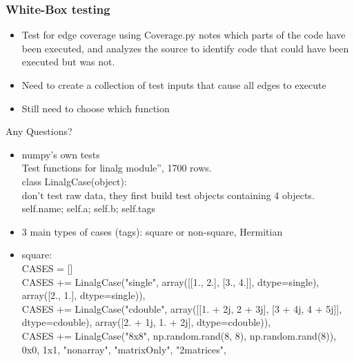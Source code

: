 \documentclass{beamer}
\begin{document}
\begin{frame}\frametitle{White-Box testing} 
\begin{itemize}
\item Test for edge coverage using Coverage.py
 notes which parts of the code have been executed, and analyzes the source to identify code that could have been executed but was not.
\item Need to create a collection of test inputs that cause all edges to execute
\item Still need to choose which function
\end{itemize}
\end{frame}

\begin{frame}
Any Questions?
\end{frame}

\begin{frame}
\begin{itemize}
\item numpy’s own tests
\\ Test functions for linalg module”, 1700 rows. 
\\ class LinalgCase(object):
\\ don’t test raw data, they first build test objects containing 4 objects. 
\\ self.name; self.a; self.b; self.tags  
\end{itemize}
\end{frame}

\begin{frame}
\begin{itemize}
\item 3 main types of cases (tags): square or non-square, Hermitian
\item square:
\\CASES = []
\\ CASES +=  LinalgCase("single", array([[1., 2.], [3., 4.]], dtype=single), array([2., 1.], dtype=single)),
\\ CASES +=   LinalgCase("cdouble", array([[1. + 2j, 2 + 3j], [3 + 4j, 4 + 5j]], dtype=cdouble), array([2. + 1j, 1. + 2j], dtype=cdouble)),
\\ CASES +=  LinalgCase("8x8", np.random.rand(8, 8), np.random.rand(8)),
\\  0x0, 1x1, "nonarray", "matrixOnly", "2matrices", 
\end{itemize}
\end{frame}
\end{document}
